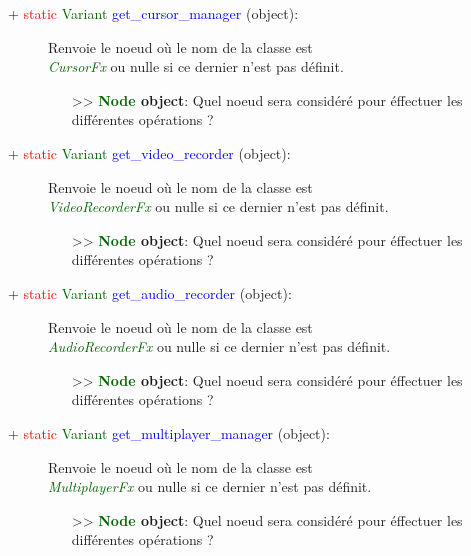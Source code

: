 \documentclass[a4paper, 11pt]{article}
\begin{document}
	\begin{description}
		\item [+ \textcolor{red}{static} \textcolor{darkgreen}{Variant} \textcolor{blue}
		{get\_cursor\_manager} (object):] Renvoie le noeud où le nom de la classe est 
		\textit{\textcolor{darkgreen}{\\CursorFx}} ou nulle si ce dernier n'est pas définit.
		\begin{itemize}
			\item [>> \textbf{\textcolor{darkgreen}{Node} object}:] Quel noeud sera considéré pour éffectuer
			les différentes opérations ?\\
		\end{itemize}
	\end{description}
	\begin{description}
		\item [+ \textcolor{red}{static} \textcolor{darkgreen}{Variant} \textcolor{blue}
		{get\_video\_recorder} (object):] Renvoie le noeud où le nom de la classe est 
		\textit{\textcolor{darkgreen}{\\VideoRecorderFx}} ou nulle si ce dernier n'est pas définit.
		\begin{itemize}
			\item [>> \textbf{\textcolor{darkgreen}{Node} object}:] Quel noeud sera considéré pour éffectuer
			les différentes opérations ?\\
		\end{itemize}
	\end{description}
	\begin{description}
		\item [+ \textcolor{red}{static} \textcolor{darkgreen}{Variant} \textcolor{blue}
		{get\_audio\_recorder} (object):] Renvoie le noeud où le nom de la classe est 
		\textit{\textcolor{darkgreen}{\\AudioRecorderFx}} ou nulle si ce dernier n'est pas définit.
		\begin{itemize}
			\item [>> \textbf{\textcolor{darkgreen}{Node} object}:] Quel noeud sera considéré pour éffectuer
			les différentes opérations ?\\
		\end{itemize}
	\end{description}
	\begin{description}
		\item [+ \textcolor{red}{static} \textcolor{darkgreen}{Variant} \textcolor{blue}
		{get\_multiplayer\_manager} (object):] Renvoie le noeud où le nom de la classe est 
		\textit{\textcolor{darkgreen}{\\MultiplayerFx}} ou nulle si ce dernier n'est pas définit.
		\begin{itemize}
			\item [>> \textbf{\textcolor{darkgreen}{Node} object}:] Quel noeud sera considéré pour éffectuer
			les différentes opérations ?\\
		\end{itemize}
	\end{description}
\end{document}
